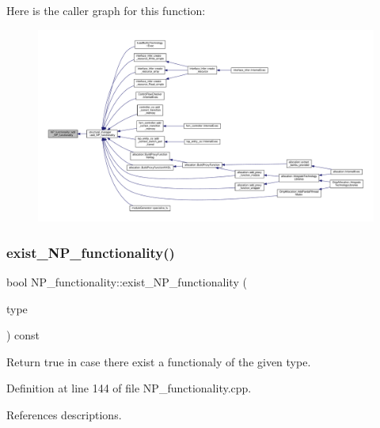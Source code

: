 Here is the caller graph for this function\+:
\nopagebreak
\begin{figure}[H]
\begin{center}
\leavevmode
\includegraphics[width=350pt]{d8/dda/classNP__functionality_a9196a24d011ae0a9e6e5bc4fed912ef7_icgraph}
\end{center}
\end{figure}
\mbox{\label{classNP__functionality_a3aff579cc53f4ecc42e7cd5b1c790142}} 
\subsubsection{\texorpdfstring{exist\+\_\+\+N\+P\+\_\+functionality()}{exist\_NP\_functionality()}}
{\footnotesize\ttfamily bool N\+P\+\_\+functionality\+::exist\+\_\+\+N\+P\+\_\+functionality (\begin{DoxyParamCaption}\item[{\hyperlink{classNP__functionality_a318d6f254060bfdf145ebeb41efe772e}{N\+P\+\_\+functionaly\+\_\+type}}]{type }\end{DoxyParamCaption}) const}



Return true in case there exist a functionaly of the given type. 



Definition at line 144 of file N\+P\+\_\+functionality.\+cpp.



References descriptions.



